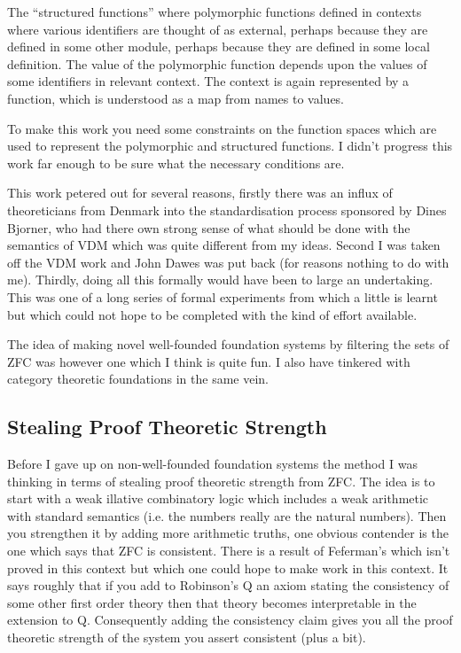 \documentclass{rbjk}
\begin{document}
\begin{article}
The ``structured functions'' where polymorphic functions defined in contexts where various identifiers are thought of as external, perhaps because they are defined in some other module, perhaps because they are defined in some local definition.
The value of the polymorphic function depends upon the values of some identifiers in relevant context.
The context is again represented by a function, which is understood as a map from names to values.

To make this work you need some constraints on the function spaces which are used to represent the polymorphic and structured functions.
I didn't progress this work far enough to be sure what the necessary conditions are.

This work petered out for several reasons, firstly there was an influx of theoreticians from Denmark into the standardisation process sponsored by Dines Bjorner, who had there own strong sense of what should be done with the semantics of VDM which was quite different from my ideas.
Second I was taken off the VDM work and John Dawes was put back (for reasons nothing to do with me).
Thirdly, doing all this formally would have been to large an undertaking.
This was one of a long series of formal experiments from which a little is learnt but which could not hope to be completed with the kind of effort available.

The idea of making novel well-founded foundation systems by filtering the sets of ZFC was however one which I think is quite fun.
I also have tinkered with category theoretic foundations in the same vein.

\subsection{Stealing Proof Theoretic Strength}

Before I gave up on non-well-founded foundation systems the method I was thinking in terms of stealing proof theoretic strength from ZFC.
The idea is to start with a weak illative combinatory logic which includes a weak arithmetic with standard semantics (i.e. the numbers really are the natural numbers).
Then you strengthen it by adding more arithmetic truths, one obvious contender is the one which says that ZFC is consistent.
There is a result of Feferman's which isn't proved in this context but which one could hope to make work in this context.
It says roughly that if you add to Robinson's Q an axiom stating the consistency of some other first order theory then that theory becomes interpretable in the extension to Q.
Consequently adding the consistency claim gives you all the proof theoretic strength of the system you assert consistent (plus a bit).


\end{article}
\end{document}
